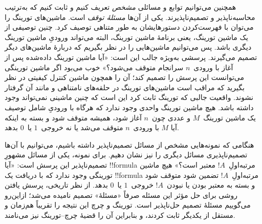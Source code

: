 \documentclass[../../../include/open-logic-section]{subfiles}
\begin{document}
همچنین می‌توانیم توابع و مسائلی \emph{مشخص} تعریف کنیم و ثابت کنیم
که به‌ترتیب محاسبه‌ناپذیر و تصمیم‌ناپذیرند. یکی از آن‌ها \emph{مسئلهٔ
توقف} است. ماشین‌های تورینگ را می‌توان با فهرست‌کردن دستورهایشان به
طور متناهی توصیف کرد. چنین توصیفی از یک ماشین تورینگ، یعنی برنامهٔ
ماشین تورینگ، البته می‌تواند ورودیِ ماشین تورینگ دیگری باشد. پس
می‌توانیم ماشین‌هایی را در نظر بگیریم که دربارهٔ ماشین‌های دیگر
تصمیم می‌گیرند. پرسشی به‌ویژه جالب این است: «آیا ماشین تورینگ داده‌شده
پس از آغاز با ورودی~$n$ سرانجام متوقف می‌شود؟» خوب می‌بود اگر ماشین
تورینگی می‌توانست این پرسش را تصمیم کند؛ آن را همچون ماشین کنترل
کیفیتی در نظر بگیرید که مراقب است ماشین‌های تورینگ در حلقه‌های
نامتناهی و مانند آن گرفتار نشوند. واقعیت جالبی که تورینگ ثابت کرد
این است که چنین ماشینی نمی‌تواند وجود داشته باشد. هیچ ماشین تورینگ
واحدی وجود ندارد که هرگاه با ورودیِ شامل توصیف یک ماشین تورینگ~$M$ و
عددی چون~$n$ آغاز شود، همیشه متوقف شود و بسته به اینکه آیا $M$ با
ورودی~$n$ متوقف می‌شد یا نه خروجی~$1$ یا~$0$ بدهد.

هنگامی که نمونه‌هایی مشخص از مسائل تصمیم‌ناپذیر داشته باشیم، می‌توانیم
با آن‌ها تصمیم‌ناپذیری مسائل دیگری را نیز نشان دهیم. برای نمونه، یکی
از مسائل مشهورِ تصمیم‌ناپذیر این پرسش است: «آیا !!{formula}
مرتبه‌اولِ~$!A$ معتبر است؟» هیچ ماشین تورینگی وجود ندارد که با دریافت
یک !!{formula} مرتبه‌اولِ~$!A$ تضمین شود متوقف شود و بسته به معتبر بودن
یا نبودن~$!A$ خروجی~$1$ یا~$0$ بدهد. از نظر تاریخی، پرسش یافتن روشی
برای حل مؤثر این مسئله صرفاً «مسئلهٔ» تصمیم نامیده می‌شد؛ ازاین‌رو
می‌گوییم مسئلهٔ تصمیم حل‌ناپذیر است. تورینگ و چرچ این نتیجه را تقریباً
هم‌زمان و مستقل از یکدیگر ثابت کردند، و بنابراین آن را قضیهٔ
چرچ--تورینگ نیز می‌نامند.
\end{document}
